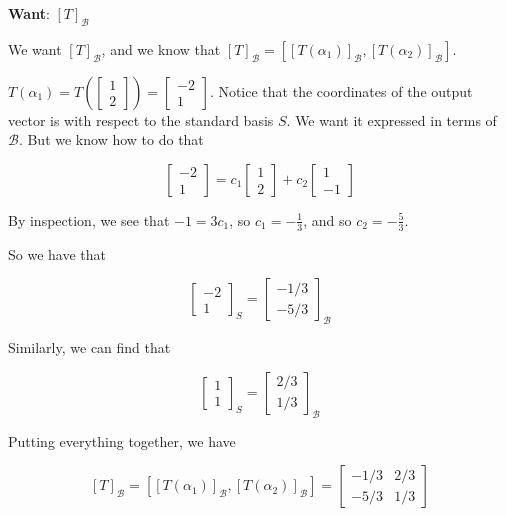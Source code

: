\documentclass[12pt]{article}
\def\B{\mathcal B}
\begin{document}
  {\bf Want}: $[T]_\B$

  We want $[T]_\B$, and we know that $[T]_\B = \left[[T(\alpha_1)]_\B,
  [T(\alpha_2)]_\B\right]$.

  $T(\alpha_1) = T\left(\begin{bmatrix} 1 \\ 2 \end{bmatrix}\right) = \begin{bmatrix} -2 \\
  1 \end{bmatrix}$. Notice that the coordinates of the output vector is with
  respect to the standard basis $S$. We want it expressed in terms of $\B$. But
  we know how to do that

  \[
    \begin{bmatrix}
      -2 \\
      1
    \end{bmatrix}
    =
    c_1
    \begin{bmatrix}
      1 \\ 2
    \end{bmatrix}
    + c_2
    \begin{bmatrix}
      1 \\ -1
    \end{bmatrix}
  \]

  By inspection, we see that $-1 = 3c_1$, so $c_1 = -\frac{1}{3}$, and so $c_2 =
  -\frac{5}{3}$.

  So we have that

  \[
    \begin{bmatrix}
      -2 \\ 1
    \end{bmatrix}_S
    =
    \begin{bmatrix}
      -1 / 3 \\ -5 / 3
    \end{bmatrix}_\B
  \]

  Similarly, we can find that

  \[
    \begin{bmatrix}
      1 \\ 1
    \end{bmatrix}_S
    =
    \begin{bmatrix}
      2 / 3 \\ 1 / 3
    \end{bmatrix}_\B
  \]

  Putting everything together, we have

  \[
    [T]_\B = \left[[T(\alpha_1)]_\B, [T(\alpha_2)]_\B\right]
    = \begin{bmatrix}
      -1 / 3 & 2 / 3 \\
      -5 / 3 & 1 / 3
    \end{bmatrix}
  \]
\end{document}
